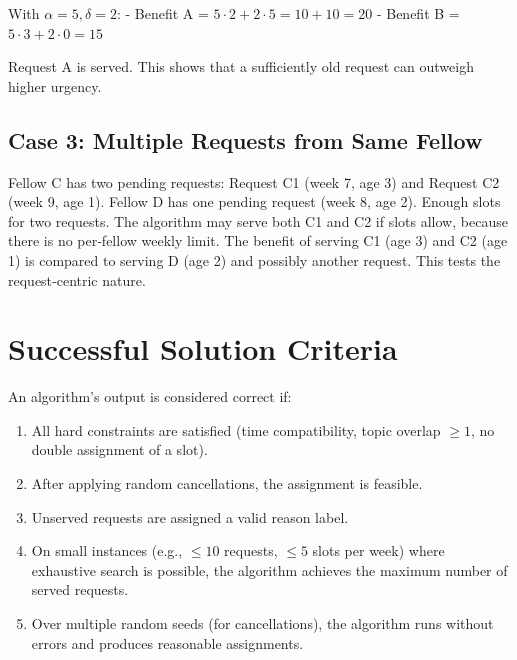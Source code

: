 \documentclass[12pt]{article}
\begin{document}
With $\alpha=5, \delta=2$:
- Benefit A = $5\cdot2 + 2\cdot5 = 10 + 10 = 20$
- Benefit B = $5\cdot3 + 2\cdot0 = 15$

Request A is served. This shows that a sufficiently old request can outweigh higher urgency.

\subsection*{Case 3: Multiple Requests from Same Fellow}
Fellow C has two pending requests: Request C1 (week 7, age 3) and Request C2 (week 9, age 1). Fellow D has one pending request (week 8, age 2). Enough slots for two requests. The algorithm may serve both C1 and C2 if slots allow, because there is no per‑fellow weekly limit. The benefit of serving C1 (age 3) and C2 (age 1) is compared to serving D (age 2) and possibly another request. This tests the request‑centric nature.

\section*{Successful Solution Criteria}

An algorithm's output is considered correct if:

\begin{enumerate}
\item All hard constraints are satisfied (time compatibility, topic overlap $\ge 1$, no double assignment of a slot).
\item After applying random cancellations, the assignment is feasible.
\item Unserved requests are assigned a valid reason label.
\item On small instances (e.g., $\le 10$ requests, $\le 5$ slots per week) where exhaustive search is possible, the algorithm achieves the maximum number of served requests.
\item Over multiple random seeds (for cancellations), the algorithm runs without errors and produces reasonable assignments.
\end{enumerate}
\end{document}
